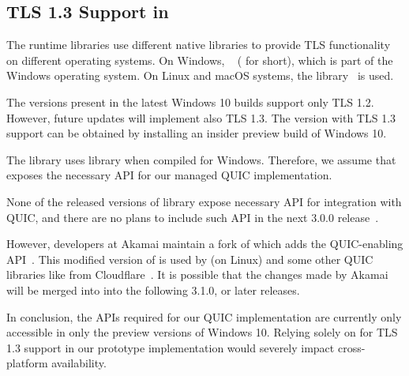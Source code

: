 \subsection{TLS 1.3 Support in \dotnet{}}


The \dotnet{} runtime libraries use different native libraries to provide TLS functionality on
different operating systems. On Windows, ~\cite{Schannel} (\libschannel{}
for short), which is part of the Windows operating system. On Linux and macOS systems, the
\libopenssl{} library~\cite{OpenSSLWeb} is used.

\begin{description}

    The \libschannel{} versions present in the latest Windows 10
    builds support only TLS 1.2.  However, future updates will implement also TLS 1.3. The
    \libschannel{} version with TLS 1.3 support can be obtained by installing an insider preview
    build of Windows 10.

    The \libmsquic{} library uses \libschannel{} library when compiled for Windows. Therefore, we
    assume that \libschannel{} exposes the necessary API for our managed QUIC implementation.

    \ditem{\libopenssl{}}
    None of the released versions of \libopenssl{} library expose necessary API for integration
    with QUIC, and there are no plans to include such API in the next \libopenssl{} 3.0.0
    release~\cite{OpensslBlogNoQuic}.

    However, developers at Akamai maintain a fork of \libopenssl{} which adds the QUIC-enabling
    API~\cite{AkamaiOpensslGithub}. This modified version of \libopenssl{} is used by \libmsquic{}
    (on Linux) and some other QUIC libraries like  from
    Cloudflare~\cite{quicheGithub}. It is possible that the changes made by Akamai will be merged
    into \libopenssl{} into the following 3.1.0, or later releases.

\end{description}

In conclusion, the APIs required for our QUIC implementation are currently only accessible in only
the preview versions of Windows 10. Relying solely on \libschannel{} for TLS 1.3 support in our
prototype implementation would severely impact cross-platform availability.

